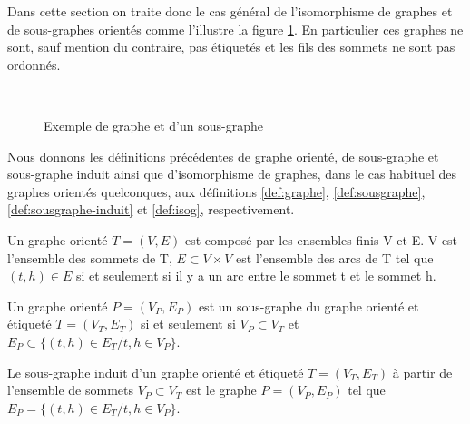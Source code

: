 Dans cette section on traite donc le cas général de l'isomorphisme de graphes et de sous-graphes orientés comme l'illustre la figure \ref{fig:ex-graphe-sg}. En particulier ces graphes ne sont, sauf mention du contraire, pas étiquetés et les fils des sommets ne sont pas ordonnés.

\begin{figure}[h]
\begin{center}
  \subfigure[Graphe T]{
\label{fig:ex-graphe}
\texttt{[image: supports/algos/gT\_circo\_cropped0.pdf]}
}\quad
  \subfigure[Graphe P, isomorphe à un sous-graphe de T]{
\label{fig:ex-sg}
\texttt{[image: supports/algos/gP\_circo\_cropped0.pdf]}
}\\
\end{center}
\caption{Exemple de graphe et d'un sous-graphe}
\label{fig:ex-graphe-sg}
\end{figure}

Nous donnons les définitions précédentes de graphe orienté, de sous-graphe et sous-graphe induit ainsi que d'isomorphisme de graphes, dans le cas habituel des graphes orientés quelconques, aux définitions \ref{def:graphe}, \ref{def:sousgraphe}, \ref{def:sousgraphe-induit} et \ref{def:isog}, respectivement.

\begin{defi}\label{def:graphe}
Un graphe orienté $T=(V, E)$ est composé par les ensembles finis V et E.
V est l'ensemble des sommets de T, $E\subset V\times V$ est l'ensemble des arcs de T tel que $(t, h)\in E$ si et seulement si il y a un arc entre le sommet t et le sommet h.
\end{defi}

\begin{defi}\label{def:sousgraphe}
Un graphe orienté $P=(V_P, E_P)$ est un sous-graphe du graphe orienté et étiqueté $T=(V_T, E_T)$ si et seulement si $V_P \subset V_T$ et $E_P\subset\{(t, h)\in E_T / t, h \in V_P \}$.
\end{defi}

\begin{defi}\label{def:sousgraphe-induit}
Le sous-graphe induit d'un graphe orienté et étiqueté $T=(V_T, E_T)$ à partir de l'ensemble de sommets $V_P \subset V_T$ est le graphe $P=(V_P, E_P)$ tel que $E_P=\{(t, h)\in E_T / t, h \in V_P \}$.
\end{defi}

